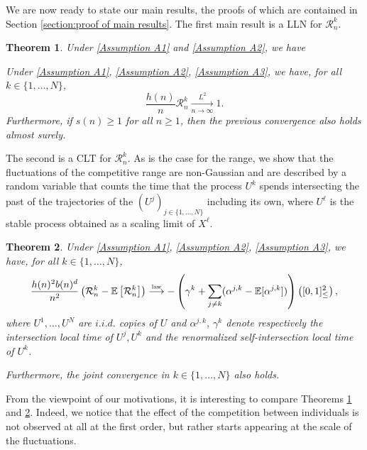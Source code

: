 \documentclass[10pt,a4paper]{amsart}
\newcommand{\R}{\mathcal R}
\newcommand{\EE}{\mathbb E}
\newcommand{\1}{\mathds{1}}
\newcommand{\distribution}{\stackrel{\scaleto{\mathrm{law}}{4pt}}{\longrightarrow}}
\newtheorem{theorem}{Theorem}
\numberwithin{equation}{section}
\begin{document}
We are now ready to state our main results, the proofs of which are contained in Section \ref{section:proof of main results}. The first main result is a LLN for $\R_n^k$.
\begin{theorem}
    \label{theorem:LLN}
    Under \ref{Assumption A1} and \ref{Assumption A2}, we have 
    
    Under \ref{Assumption A1}, \ref{Assumption A2}, \ref{Assumption A3}, we have, for all $k\in\{1,\dots,N\}$,
    \begin{equation*}
        \frac{h(n)}{n}\R_n^k\underset{n\rightarrow\infty}{\overset{L^2}\longrightarrow}1.
    \end{equation*}
    Furthermore, if $s(n)\ge1$ for all $n\ge1$, then the previous convergence also holds almost surely.
\end{theorem}
The second is a CLT for $\R_n^k$. As is the case for the range, we show that the fluctuations of the competitive range are non-Gaussian and are described by a random variable that counts the time that the process $U^k$  spends intersecting the past of the trajectories of the $(U^j)_{j\in\{1,\dots,N\}}$ including its own, where $U^\ell$ is the stable process obtained as a scaling limit of $X^\ell$.


\begin{theorem}
Under \ref{Assumption A1}, \ref{Assumption A2}, \ref{Assumption A3}, we have, for all $k\in\{1,\dots,N\}$,
\label{theorem:CLT}
    \begin{equation*}
    \frac{h(n)^2b(n)^d}{n^2}\left(\R_n^k-\EE\left[\R_n^k\right]\right)\distribution -\left(\gamma^k+\sum_{j\ne k} (\alpha^{j,k}-\EE[\alpha^{j,k}])\right)\left([0,1]_\le^2\right),
\end{equation*}
where $U^1,\dots,U^N$ are $i.i.d.$ copies of $U$ and $\alpha^{j,k}$, $\gamma^k$ denote respectively the intersection local time of $U^j,U^k$ and the renormalized self-intersection local time of $U^k$.

Furthermore, the joint convergence in $k\in\{1,\dots,N\}$ also holds.
\end{theorem}

From the viewpoint of our motivations, it is interesting to compare Theorems \ref{theorem:LLN} and \ref{theorem:CLT}. Indeed, we notice that the effect of the competition between individuals is not observed at all at the first order, but rather starts appearing at the scale of the fluctuations.
\end{document}
